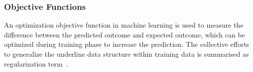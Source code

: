 \subsubsection{Objective Functions}
An optimization objective function in machine learning is used to measure the difference between the predicted outcome and expected outcome, which can be optimized during training phase to increase the prediction. The collective efforts to generalize the underline data structure within training data is summarised as regularization term~\cite{goodfellow_2015}.  
